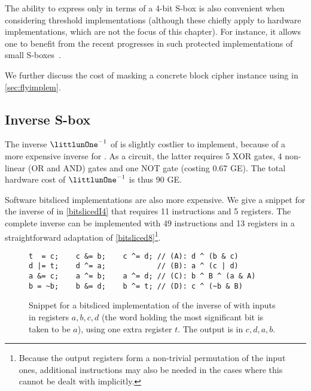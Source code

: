 The ability to express \littlunOne only in terms of a 4-bit S-box is also convenient when considering threshold implementations (although these chiefly apply to hardware implementations,
which are not the focus of this chapter).
For instance, it allows one to benefit from the recent progresses in such protected implementations of small S-boxes~\cite{ti-4bit}.

We further discuss the cost of masking a concrete block cipher instance using \littlunOne in \autoref{sec:flyimplem}.

\subsection{Inverse S-box}
The inverse $\littlunOne^{-1}$ of \littlunOne is slightly costlier to implement, because of a more expensive inverse for \littlunS. As a circuit, the latter requires 5 XOR gates, 4 non-linear (OR and AND) gates
and one NOT gate (costing 0.67 GE). The total hardware cost of $\littlunOne^{-1}$ is thus 90 GE.

Software bitsliced implementations are also more expensive. We give a snippet for the inverse of \littlunS in
\autoref{bitslicedI4} that requires 11 instructions and 5 registers. The complete inverse can be implemented with 49 instructions and 13 registers in a straightforward adaptation of \autoref{bitsliced8}\footnote{Because
the output registers form a non-trivial permutation of the input ones, additional instructions may also be needed in the cases where this cannot be dealt with implicitly.}.

\begin{figure}[ht]
\begin{verbatim}
t  = c;    c &= b;    c ^= d; // (A): d ^ (b & c)
d |= t;    d ^= a;            // (B): a ^ (c | d) 
a &= c;    a ^= b;    a ^= d; // (C): b ^ B ^ (a & A) 
b = ~b;    b &= d;    b ^= t; // (D): c ^ (~b & B)
\end{verbatim}
\caption[Snippet for a bitsliced \C implementation of the inverse of \littlunS.]{Snippet for a bitsliced \C implementation of the inverse of \littlunS \label{bitslicedI4} with inputs in registers $a,b,c,d$ (the word holding the most significant bit is taken to be $a$), using one extra register $t$.
The output is in $c,d,a,b$.}
\end{figure}
